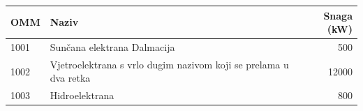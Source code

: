 \documentclass[a4paper]{article}
\begin{document}
\begin{tabular}{lp{5cm}r}
\toprule
OMM & Naziv & Snaga (kW) \\
\midrule
1001 & Sunčana elektrana Dalmacija & 500 \\
1002 & Vjetroelektrana s vrlo dugim nazivom koji se prelama u dva retka & 12000 \\
1003 & Hidroelektrana & 800 \\
\bottomrule
\end{tabular}
\end{document}
